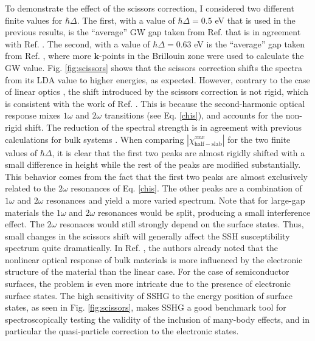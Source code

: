 \documentclass[11pt]{book}
\begin{document}
To demonstrate the effect of the scissors correction, I considered two different
finite values for $\hbar\Delta$. The first, with a value of $\hbar\Delta=0.5$ eV
that is used in the previous results, is the ``average'' GW gap taken from Ref.
\cite{rohlfingPRB95} that is in agreement with Ref. \cite{garciaCPC01}. The
second, with a value of $\hbar\Delta=0.63$ eV is the ``average'' gap taken from
Ref. \cite{asahiPRB00}, where more $\mathbf{k}$-points in the Brillouin zone
were used to calculate the GW value. Fig. \ref{fig:scissors} shows that the
scissors correction shifts the spectra from its LDA value to higher energies, as
expected. However, contrary to the case of linear optics \cite{cabellosPRB09},
the shift introduced by the scissors correction is not rigid, which is
consistent with the work of Ref. \cite{nastosPRB05}. This is because the
second-harmonic optical response mixes $1\omega$ and $2\omega$ transitions (see
Eq. \eqref{chis}), and accounts for the non-rigid shift. The reduction of the
spectral strength is in agreement with previous calculations for bulk systems
\cite{nastosPRB05, luppiPRB10, leitsmannPRB05}. When comparing
$|\chi^{xxx}_{\mathrm{half-slab}}|$ for the two finite values of $\hbar\Delta$,
it is clear that the first two peaks are almost rigidly shifted with a small
difference in height while the rest of the peaks are modified substantially.
This behavior comes from the fact that the first two peaks are almost
exclusively related to the $2\omega$ resonances of Eq. \eqref{chis}. The other
peaks are a combination of $1\omega$ and $2\omega$ resonances and yield a more
varied spectrum. Note that for large-gap materials the $1\omega$ and $2\omega$
resonances would be split, producing a small interference effect. The $2\omega$
resonaces would still strongly depend on the surface states. Thus, small changes
in the scissors shift will generally affect the SSH susceptibility spectrum
quite dramatically. In Ref. \cite{adolphPRB00}, the authors already noted that
the nonlinear optical response of bulk materials is more influenced by the
electronic structure of the material than the linear case. For the case of
semiconductor surfaces, the problem is even more intricate due to the presence
of electronic surface states. The high sensitivity of SSHG to the energy
position of surface states, as seen in Fig. \ref{fig:scissors}, makes SSHG a
good benchmark tool for spectroscopically testing the validity of the inclusion
of many-body effects, and in particular the quasi-particle correction to the
electronic states.
\end{document}
